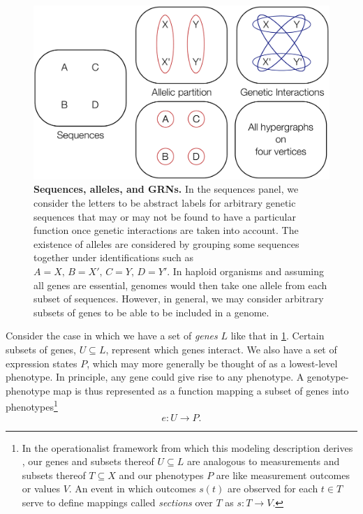 \begin{figure}[!ht]
\centering
\noindent\includegraphics[width=0.7\columnwidth]{fig/genesallelesgrns.pdf}
\caption{{\bf Sequences, alleles, and GRNs.} In the sequences panel, we consider the letters to be abstract labels for arbitrary genetic sequences that may or may not be found to have a particular function once genetic interactions are taken into account. The existence of alleles are considered by grouping some sequences together under identifications such as~$A=X,\,B=X',\,C=Y,\,D=Y'$. In haploid organisms and assuming all genes are essential, genomes would then take one allele from each subset of sequences. However, in general, we may consider arbitrary subsets of genes to be able to be included in a genome.}
\label{fig:genesallelesgrns}
\end{figure}

Consider the case in which we have a set of \emph{genes} $L$ like that in \ref{fig:genesallelesgrns}. Certain subsets of genes, $U \subseteq L$, represent which genes interact. We also have a set of expression states $P$, which may more generally be thought of as a lowest-level phenotype. In principle, any gene could give rise to any phenotype. A genotype-phenotype map is thus represented as a function mapping a subset of genes into phenotypes\footnote{In the operationalist framework from which this modeling description derives \cite{Abramsky2011}, our genes and subsets thereof $U \subseteq L$ are analogous to measurements and subsets thereof $T \subseteq X$ and our phenotypes $P$ are like measurement outcomes or values $V$. An event in which outcomes $s(t)$ are observed for each $t \in T$ serve to define mappings called \emph{sections} over $T$ as $s \colon T \rightarrow V$.}
$$
e \colon U \rightarrow  P.
$$

